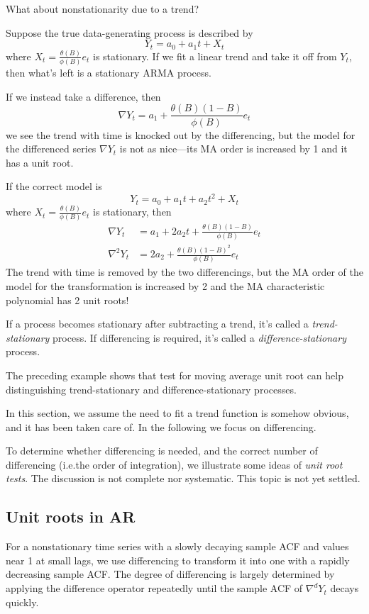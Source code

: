 \documentclass[12pt]{article}
\begin{document}
\begin{enumerate}
What about nonstationarity due to a trend?

Suppose the true data-generating process is described by
\[
Y_t = a_0 + a_1 t + X_t
\]
where $X_t = \frac{\theta(B)}{\phi(B)} e_t$ is stationary.
If we fit a linear trend and take it off from $Y_t$,
then what's left is a stationary ARMA process.

If we instead take a difference, then
\[
\nabla Y_t = a_1 + \frac{\theta(B)(1-B)}{\phi(B)} e_t
\]
we see the trend with time is knocked out by the differencing,
but the model for the differenced series $\nabla Y_t$
is not as nice---its MA order is increased by 1 and it has a unit root.

If the correct model is
\[
Y_t = a_0 + a_1 t + a_2 t^2 + X_t
\]
where $X_t = \frac{\theta(B)}{\phi(B)} e_t$ is stationary,
then
\begin{align*}
\nabla Y_t &= a_1 + 2 a_2 t + \frac{\theta(B)(1-B)}{\phi(B)} e_t
\\
\nabla^2 Y_t &= 2 a_2 + \frac{\theta(B)(1-B)^2}{\phi(B)} e_t
\end{align*}
The trend with time is removed by the two differencings,
but the MA order of the model for the transformation
is increased by 2 and the MA characteristic polynomial has 2 unit roots!

If a process becomes stationary after subtracting a trend,
it's called a \emph{trend-stationary} process.
If differencing is required,
it's called a \emph{difference-stationary} process.

The preceding example shows that test for moving average unit root
can help distinguishing trend-stationary and difference-stationary
processes.

In this section,
we assume the need to fit a trend function
is somehow obvious, and it has been taken care of.
In the following we focus on differencing.

To determine whether differencing is needed,
and the correct number of differencing (i.e.\@ the order of
integration),
we illustrate some ideas of \emph{unit root tests}.
The discussion is not complete nor systematic.
This topic is not yet settled.


\subsection{Unit roots in AR}

For a nonstationary time series with a slowly decaying sample ACF and
values near 1 at small lags,
we use differencing to transform it into one with a rapidly decreasing
sample ACF.
The degree of differencing is largely determined by applying the
difference operator repeatedly until the sample ACF
of $\nabla^d Y_t$ decays quickly.


\end{enumerate}
\end{document}
